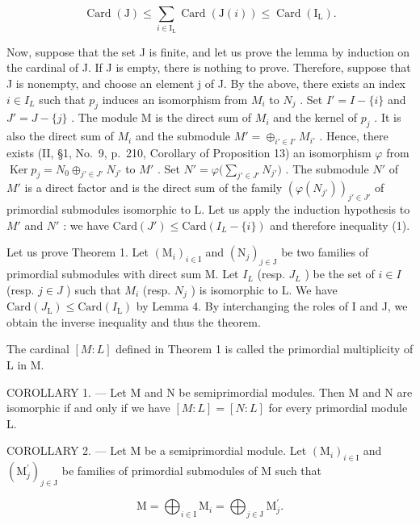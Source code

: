 \[
\operatorname{Card} (\mathrm{J}) \leqslant \sum_ {i \in \mathrm{I} _ {\mathrm{L}}} \operatorname{Card} (\mathrm{J} (i)) \leqslant \operatorname{Card} (\mathrm{I} _ {\mathrm{L}}).
\]

Now, suppose that the set J is finite, and let us prove the lemma by induction on the cardinal of J. If J is empty, there is nothing to prove. Therefore, suppose that J is nonempty, and choose an element j of J. By the above, there exists an index \(i \in I_{L}\) such that \(p_{j}\) induces an isomorphism from \(M_{i}\) to \(N_{j}\) . Set \(I' = I - \{i\}\) and \(J' = J - \{j\}\) . The module M is the direct sum of \(M_{i}\) and the kernel of \(p_{j}\) . It is also the direct sum of \(M_{i}\) and the submodule \(M' = \oplus_{i' \in I'} M_{i'}\) . Hence, there exists (II, §1, No.~9, p.~210, Corollary of Proposition 13) an isomorphism \(\varphi\) from \(\operatorname{Ker} p_{j} = N_{0} \oplus_{j' \in J'} N_{j'}\) to \(M'\) . Set \(N' = \varphi\big(\sum_{j' \in J'} N_{j'}\big)\) . The submodule \(N'\) of \(M'\) is a direct factor and is the direct sum of the family \((\varphi(N_{j'}))_{j' \in J'}\) of primordial submodules isomorphic to L. Let us apply the induction hypothesis to \(M'\) and \(N'\) : we have \(\text{Card}(J') \leqslant \text{Card}(I_L - \{i\})\) and therefore inequality (1).

Let us prove Theorem 1. Let \((\mathrm{M}_{i})_{i\in\mathrm{I}}\) and \((\mathrm{N}_{j})_{j\in\mathrm{J}}\) be two families of primordial submodules with direct sum M. Let \(I_{L}\) (resp. \(J_{L}\) ) be the set of \(i\in I\) (resp. \(j\in J\) ) such that \(M_{i}\) (resp. \(N_{j}\) ) is isomorphic to L. We have \(\mathrm{Card}(J_{\mathrm{L}})\leqslant\mathrm{Card}(I_{\mathrm{L}})\) by Lemma 4. By interchanging the roles of I and J, we obtain the inverse inequality and thus the theorem.

The cardinal \([M : L]\) defined in Theorem 1 is called the primordial multiplicity of L in M.

COROLLARY 1. --- Let M and N be semiprimordial modules. Then M and N are isomorphic if and only if we have \([M:L]=[N:L]\) for every primordial module L.

COROLLARY 2. --- Let M be a semiprimordial module. Let \((\mathrm{M}_{i})_{i\in\mathrm{I}}\) and \((\mathrm{M}_{j}^{\prime})_{j\in\mathrm{J}}\) be families of primordial submodules of M such that

\[
\mathrm{M} = \bigoplus_ {i \in \mathrm{I}} \mathrm{M} _ {i} = \bigoplus_ {j \in \mathrm{J}} \mathrm{M} _ {j} ^ {\prime}.
\]

